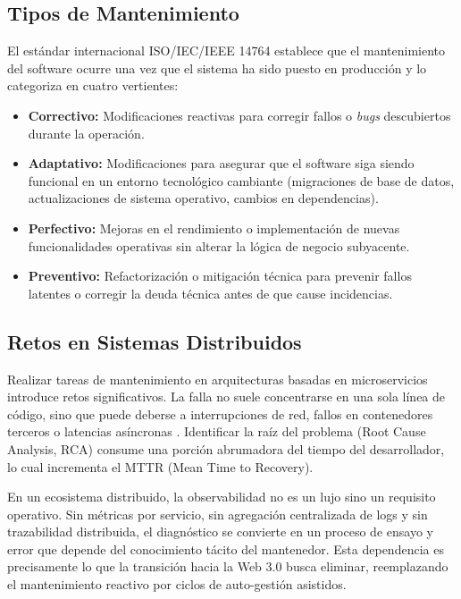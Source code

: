 \subsection{Tipos de Mantenimiento}

El est\'{a}ndar internacional ISO/IEC/IEEE 14764 \cite{iso14764} establece que el mantenimiento del software ocurre una vez que el sistema ha sido puesto en producci\'{o}n y lo categoriza en cuatro vertientes:

\begin{itemize}
    \item \textbf{Correctivo:} Modificaciones reactivas para corregir fallos o \textit{bugs} descubiertos durante la operaci\'{o}n.
    \item \textbf{Adaptativo:} Modificaciones para asegurar que el software siga siendo funcional en un entorno tecnol\'{o}gico cambiante (migraciones de base de datos, actualizaciones de sistema operativo, cambios en dependencias).
    \item \textbf{Perfectivo:} Mejoras en el rendimiento o implementaci\'{o}n de nuevas funcionalidades operativas sin alterar la l\'{o}gica de negocio subyacente.
    \item \textbf{Preventivo:} Refactorizaci\'{o}n o mitigaci\'{o}n t\'{e}cnica para prevenir fallos latentes o corregir la deuda t\'{e}cnica antes de que cause incidencias.
\end{itemize}

\subsection{Retos en Sistemas Distribuidos}

Realizar tareas de mantenimiento en arquitecturas basadas en microservicios introduce retos significativos. La falla no suele concentrarse en una sola l\'{i}nea de c\'{o}digo, sino que puede deberse a interrupciones de red, fallos en contenedores terceros o latencias as\'{i}ncronas \cite{richardson2018microservices}. Identificar la ra\'{i}z del problema (Root Cause Analysis, RCA) consume una porci\'{o}n abrumadora del tiempo del desarrollador, lo cual incrementa el MTTR (Mean Time to Recovery).

En un ecosistema distribuido, la observabilidad no es un lujo sino un requisito operativo. Sin m\'{e}tricas por servicio, sin agregaci\'{o}n centralizada de logs y sin trazabilidad distribuida, el diagn\'{o}stico se convierte en un proceso de ensayo y error que depende del conocimiento t\'{a}cito del mantenedor. Esta dependencia es precisamente lo que la transici\'{o}n hacia la Web 3.0 busca eliminar, reemplazando el mantenimiento reactivo por ciclos de auto-gesti\'{o}n asistidos.

